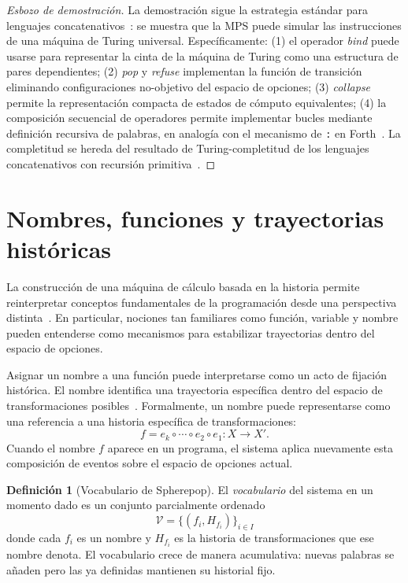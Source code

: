 \documentclass[12pt]{article}
\theoremstyle{plain}
\theoremstyle{definition}
\newtheorem{definition}[theorem]{Definición}
\begin{document}
\begin{proof}[Esbozo de demostración]
La demostración sigue la estrategia estándar para lenguajes concatenativos~\cite{moore}: se muestra que la MPS puede simular las instrucciones de una máquina de Turing universal. Específicamente: (1) el operador \emph{bind} puede usarse para representar la cinta de la máquina de Turing como una estructura de pares dependientes; (2) \emph{pop} y \emph{refuse} implementan la función de transición eliminando configuraciones no-objetivo del espacio de opciones; (3) \emph{collapse} permite la representación compacta de estados de cómputo equivalentes; (4) la composición secuencial de operadores permite implementar bucles mediante definición recursiva de palabras, en analogía con el mecanismo de \texttt{:} en Forth~\cite{moore}. La completitud se hereda del resultado de Turing-completitud de los lenguajes concatenativos con recursión primitiva~\cite{turner}.
\end{proof}

\section{Nombres, funciones y trayectorias históricas}
\label{sec:nombres}

La construcción de una máquina de cálculo basada en la historia permite reinterpretar conceptos fundamentales de la programación desde una perspectiva distinta~\cite{church,plotkin,okasaki}. En particular, nociones tan familiares como función, variable y nombre pueden entenderse como mecanismos para estabilizar trayectorias dentro del espacio de opciones.

Asignar un nombre a una función puede interpretarse como un acto de fijación histórica. El nombre identifica una trayectoria específica dentro del espacio de transformaciones posibles~\cite{church}. Formalmente, un nombre puede representarse como una referencia a una historia específica de transformaciones:
\[
f = e_k \circ \cdots \circ e_2 \circ e_1 : X \longrightarrow X'.
\]
Cuando el nombre $f$ aparece en un programa, el sistema aplica nuevamente esta composición de eventos sobre el espacio de opciones actual.

\begin{definition}[Vocabulario de Spherepop]
\label{def:vocabulario}
El \emph{vocabulario} del sistema en un momento dado es un conjunto parcialmente ordenado
\[
\mathcal{V} = \{(f_i, H_{f_i})\}_{i \in I}
\]
donde cada $f_i$ es un nombre y $H_{f_i}$ es la historia de transformaciones que ese nombre denota. El vocabulario crece de manera acumulativa: nuevas palabras se añaden pero las ya definidas mantienen su historial fijo.
\end{definition}
\end{document}
